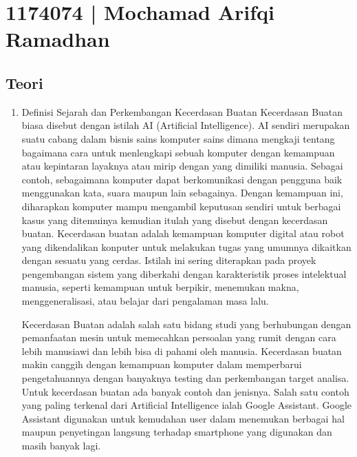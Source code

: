 \section{1174074 | Mochamad Arifqi Ramadhan}
\subsection{Teori}
\begin{enumerate}
	\item Definisi Sejarah dan Perkembangan Kecerdasan Buatan
	\hfill\break
	 Kecerdasan Buatan biasa disebut dengan istilah AI (Artificial Intelligence). AI sendiri merupakan suatu cabang dalam bisnis sains komputer sains dimana mengkaji tentang bagaimana cara untuk menlengkapi sebuah komputer dengan kemampuan atau kepintaran layaknya atau mirip dengan yang dimiliki manusia. Sebagai contoh, sebagaimana komputer dapat berkomunikasi dengan pengguna baik menggunakan kata, suara maupun lain sebagainya. Dengan kemampuan ini, diharapkan komputer mampu mengambil keputusan sendiri untuk berbagai kasus yang ditemuinya kemudian itulah yang disebut dengan kecerdasan buatan. Kecerdasan buatan adalah kemampuan komputer digital atau robot yang dikendalikan konputer untuk melakukan tugas yang umumnya dikaitkan dengan sesuatu yang cerdas. Istilah ini sering diterapkan pada proyek pengembangan sistem yang diberkahi dengan karakteristik proses intelektual manusia, seperti kemampuan untuk berpikir, menemukan makna, menggeneralisasi, atau belajar dari pengalaman masa lalu.

    Kecerdasan Buatan adalah salah satu bidang studi yang berhubungan dengan pemanfaatan mesin untuk memecahkan persoalan yang rumit dengan cara lebih manusiawi dan lebih bisa di pahami oleh manusia. Kecerdasan buatan makin canggih dengan kemampuan komputer dalam memperbarui pengetahuannya dengan banyaknya testing dan perkembangan target analisa. Untuk kecerdasan buatan ada banyak contoh dan jenisnya. Salah satu contoh yang paling terkenal dari Artificial Intelligence ialah Google Assistant. Google Assistant digunakan untuk kemudahan user dalam menemukan berbagai hal maupun penyetingan langsung terhadap smartphone yang digunakan dan masih banyak lagi.


\end{enumerate}
